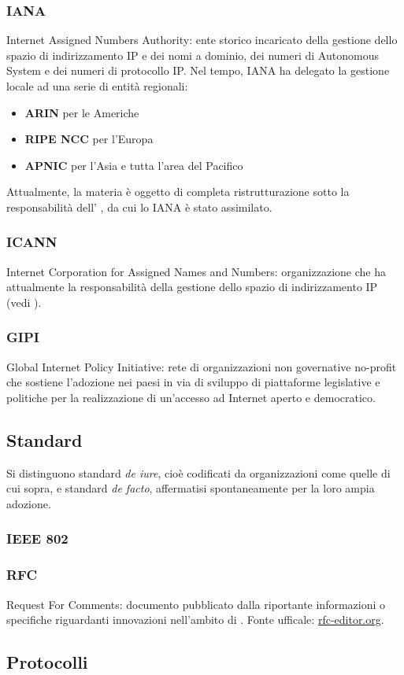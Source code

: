 \documentclass[a4paper,11pt]{article}
\def\sub#1{\subsection{#1}\label{#1}}
\def\subsub#1{\subsubsection{#1}\label{#1}}
\def\vedi#1{\nameref{#1}}
\begin{document}
\subsub{IANA}
Internet Assigned Numbers Authority: ente storico incaricato della gestione dello spazio di indirizzamento IP e dei nomi a dominio, dei numeri di Autonomous System e dei numeri di protocollo IP. Nel tempo, IANA ha delegato la gestione locale ad una serie di entità regionali:
\begin{itemize}
\item \textbf{ARIN} per le Americhe
\item \textbf{RIPE NCC} per l'Europa
\item \textbf{APNIC} per l'Asia e tutta l'area del Pacifico
\end{itemize}
Attualmente, la materia è oggetto di completa ristrutturazione sotto la responsabilità dell’ \vedi{ICANN}, da cui lo IANA è stato assimilato.
\subsub{ICANN}
Internet Corporation for Assigned Names and Numbers: organizzazione che ha attualmente la responsabilità della gestione dello spazio di indirizzamento IP (vedi \vedi{IANA}).
\subsub{GIPI}
Global Internet Policy Initiative: rete di organizzazioni non governative no-profit che sostiene l’adozione nei paesi in via di sviluppo di piattaforme legislative e politiche per la realizzazione di un’accesso ad Internet aperto e democratico.
\sub{Standard}
Si distinguono standard \textit{de iure}, cioè codificati da organizzazioni come quelle di cui sopra, e standard \textit{de facto}, affermatisi spontaneamente per la loro ampia adozione.
\subsub{IEEE 802}
\subsub{RFC}
Request For Comments: documento pubblicato dalla \vedi{IETF} riportante informazioni o specifiche riguardanti innovazioni nell'ambito di \vedi{Internet}. Fonte ufficale: \url{rfc-editor.org}.
\sub{Protocolli} %
\end{document}
